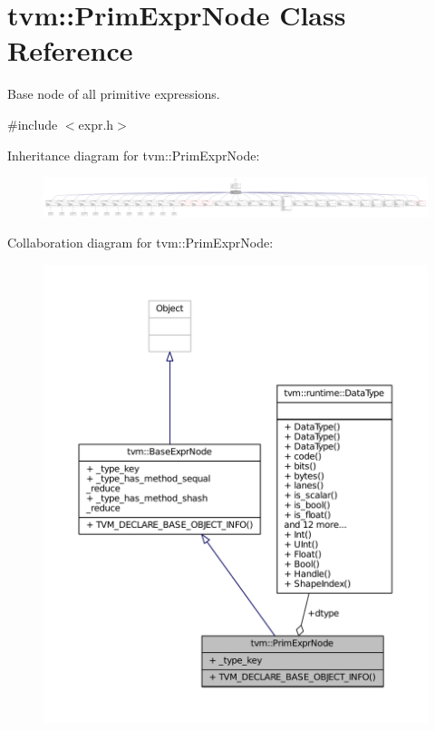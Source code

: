 \hypertarget{classtvm_1_1PrimExprNode}{}\section{tvm\+:\+:Prim\+Expr\+Node Class Reference}
\label{classtvm_1_1PrimExprNode}


Base node of all primitive expressions.  




{\ttfamily \#include $<$expr.\+h$>$}



Inheritance diagram for tvm\+:\+:Prim\+Expr\+Node\+:
\nopagebreak
\begin{figure}[H]
\begin{center}
\leavevmode
\includegraphics[width=350pt]{classtvm_1_1PrimExprNode__inherit__graph}
\end{center}
\end{figure}


Collaboration diagram for tvm\+:\+:Prim\+Expr\+Node\+:
\nopagebreak
\begin{figure}[H]
\begin{center}
\leavevmode
\includegraphics[width=350pt]{classtvm_1_1PrimExprNode__coll__graph}
\end{center}
\end{figure}
